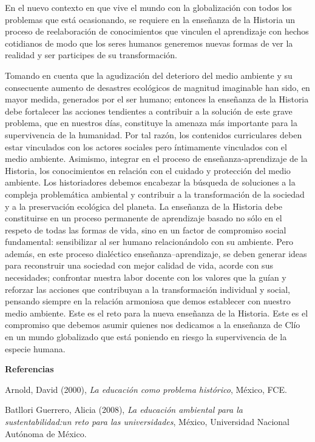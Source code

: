 En el nuevo contexto en que vive el mundo con la globalización con 
todos los problemas que está ocasionando, se requiere en la enseñanza 
de la Historia un proceso de reelaboración de conocimientos que 
vinculen el aprendizaje con hechos cotidianos de modo que los seres 
humanos generemos nuevas formas de ver la realidad y ser participes de 
su transformación.

Tomando en cuenta que la agudización del deterioro del medio ambiente y 
su consecuente aumento de desastres ecológicos de magnitud imaginable 
han sido, en mayor medida, generados por el ser humano; entonces la 
enseñanza de la Historia debe fortalecer las acciones tendientes a 
contribuir a la solución de este grave problema, que en nuestros días, 
constituye la amenaza más importante para la supervivencia de la 
humanidad. Por tal razón, los contenidos curriculares deben estar 
vinculados con los actores sociales pero íntimamente vinculados con el 
medio ambiente. Asimismo, integrar en el proceso de 
enseñanza-aprendizaje de la Historia, los conocimientos en relación con 
el cuidado y protección del medio ambiente. Los historiadores debemos 
encabezar la búsqueda de soluciones a la compleja problemática 
ambiental y contribuir a la transformación de la sociedad y a la 
preservación ecológica del planeta. La enseñanza de la Historia debe 
constituirse en un proceso permanente de aprendizaje basado no sólo en 
el respeto de todas las formas de vida, sino en un factor de compromiso 
social fundamental: sensibilizar al ser humano relacionándolo con su 
ambiente. Pero además, en este proceso dialéctico 
enseñanza--aprendizaje, se deben generar ideas para reconstruir una 
sociedad con mejor calidad de vida, acorde con sus necesidades; 
confrontar nuestra labor docente con los valores que la guían y 
reforzar las acciones que contribuyan a la transformación individual y 
social, pensando siempre en la relación armoniosa que demos establecer 
con nuestro medio ambiente. Este es el reto para la nueva enseñanza de 
la Historia. Este es el compromiso que debemos asumir quienes nos 
dedicamos a la enseñanza de Clío en un mundo globalizado que está 
poniendo en riesgo la supervivencia de la especie humana.  


\bigskip 
{\bfseries Referencias}
\enlargethispage{1\baselineskip}

\medskip
Arnold, David (2000), \textit{La educación como problema histórico}, 
México, FCE.

Batllori Guerrero, Alicia (2008), \textit{La educación ambiental para la sustentabilidad:un reto para las universidades}, México, Universidad Nacional Autónoma de México.

